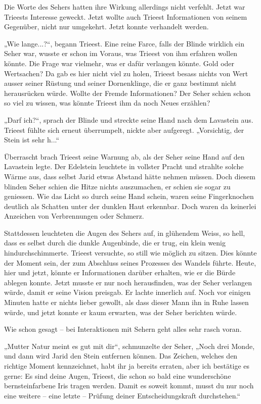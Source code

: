 Die Worte des Sehers hatten ihre Wirkung allerdings nicht verfehlt. Jetzt war Trieests Interesse geweckt. Jetzt wollte auch Trieest Informationen von seinem Gegenüber, nicht nur umgekehrt. Jetzt konnte verhandelt werden.

„Wie lange...?“, begann Trieest. Eine reine Farce, falls der Blinde wirklich ein Seher war, wusste er schon im Voraus, was Trieest von ihm erfahren wollen könnte. Die Frage war vielmehr, was er dafür verlangen könnte. Gold oder Wertsachen? Da gab es hier nicht viel zu holen, Trieest besass nichts von Wert ausser seiner Rüstung und seiner Dornenklinge, die er ganz bestimmt nicht herausrücken würde. Wollte der Fremde Informationen? Der Seher schien schon so viel zu wissen, was könnte Trieest ihm da noch Neues erzählen?

„Darf ich?“, sprach der Blinde und streckte seine Hand nach dem Lavastein aus. Trieest fühlte sich erneut überrumpelt, nickte aber aufgeregt. „Vorsichtig, der Stein ist sehr h...“

Überrascht brach Trieest seine Warnung ab, als der Seher seine Hand auf den Lavastein legte. Der Edelstein leuchtete in vollster Pracht und strahlte solche Wärme aus, dass selbst Jarid etwas Abstand hätte nehmen müssen. Doch diesem blinden Seher schien die Hitze nichts auszumachen, er schien sie sogar zu geniessen. Wie das Licht so durch seine Hand schein, waren seine Fingerknochen deutlich als Schatten unter der dunklen Haut erkennbar. Doch waren da keinerlei Anzeichen von Verbrennungen oder Schmerz.

Stattdessen leuchteten die Augen des Sehers auf, in glühendem Weiss, so hell, dass es selbst durch die dunkle Augenbinde, die er trug, ein klein wenig hindurchschimmerte. Trieest versuchte, so still wie möglich zu sitzen. Dies könnte der Moment sein, der zum Abschluss seines Prozesses des Wandels führte. Heute, hier und jetzt, könnte er Informationen darüber erhalten, wie er die Bürde ablegen konnte. Jetzt musste er nur noch herausfinden, was der Seher verlangen würde, damit er seine Vision preisgab. Er lachte innerlich auf. Noch vor einigen Minuten hatte er nichts lieber gewollt, als dass dieser Mann ihn in Ruhe lassen würde, und jetzt konnte er kaum erwarten, was der Seher berichten würde.

Wie schon gesagt – bei Interaktionen mit Sehern geht alles sehr rasch voran.

„Mutter Natur meint es gut mit dir“, schmunzelte der Seher, „Noch drei Monde, und dann wird Jarid den Stein entfernen können. Das Zeichen, welches den richtige Moment kennzeichnet, habt ihr ja bereits erraten, aber ich bestätige es gerne: Es sind deine Augen, Trieest, die schon so bald eine wunderschöne bernsteinfarbene Iris tragen werden. Damit es soweit kommt, musst du nur noch eine weitere – eine letzte – Prüfung deiner Entscheidungskraft durchstehen.“

